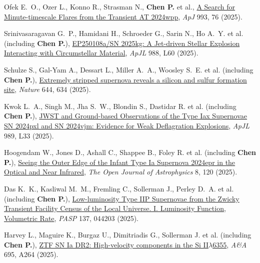 \item Ofek E.~O., Ozer L., Konno R., Strasman N., \textbf{Chen P.} et al., \href{https://ui.adsabs.harvard.edu/abs/2025ApJ...993...76O}{A Search for Minute-timescale Flares from the Transient AT 2024wpp}, \textit{ApJ} 993, 76 (2025).

\item Srinivasaragavan G.~P., Hamidani H., Schroeder G., Sarin N., Ho A.~Y. et al. (including \textbf{Chen P.}), \href{https://ui.adsabs.harvard.edu/abs/2025ApJ...988L..60S}{EP250108a/SN 2025kg: A Jet-driven Stellar Explosion Interacting with Circumstellar Material}, \textit{ApJL} 988, L60 (2025).

\item Schulze S., Gal-Yam A., Dessart L., Miller A.~A., Woosley S.~E. et al. (including \textbf{Chen P.}), \href{https://ui.adsabs.harvard.edu/abs/2025Natur.644..634S}{Extremely stripped supernova reveals a silicon and sulfur formation site}, \textit{Nature} 644, 634 (2025).

\item Kwok L.~A., Singh M., Jha S.~W., Blondin S., Dastidar R. et al. (including \textbf{Chen P.}), \href{https://ui.adsabs.harvard.edu/abs/2025ApJ...989L..33K}{JWST and Ground-based Observations of the Type Iax Supernovae SN 2024pxl and SN 2024vjm: Evidence for Weak Deflagration Explosions}, \textit{ApJL} 989, L33 (2025).

\item Hoogendam W., Jones D., Ashall C., Shappee B., Foley R. et al. (including \textbf{Chen P.}), \href{https://ui.adsabs.harvard.edu/abs/2025OJAp....8E.120H}{Seeing the Outer Edge of the Infant Type Ia Supernova 2024epr in the Optical and Near Infrared}, \textit{The Open Journal of Astrophysics} 8, 120 (2025).

\item Das K.~K., Kasliwal M.~M., Fremling C., Sollerman J., Perley D.~A. et al. (including \textbf{Chen P.}), \href{https://ui.adsabs.harvard.edu/abs/2025PASP..137d4203D}{Low-luminosity Type IIP Supernovae from the Zwicky Transient Facility Census of the Local Universe. I. Luminosity Function, Volumetric Rate}, \textit{PASP} 137, 044203 (2025).

\item Harvey L., Maguire K., Burgaz U., Dimitriadis G., Sollerman J. et al. (including \textbf{Chen P.}), \href{https://ui.adsabs.harvard.edu/abs/2025A&A...695A.264H}{ZTF SN Ia DR2: High-velocity components in the Si II{\ensuremath{\lambda}}6355}, \textit{A\&A} 695, A264 (2025).

